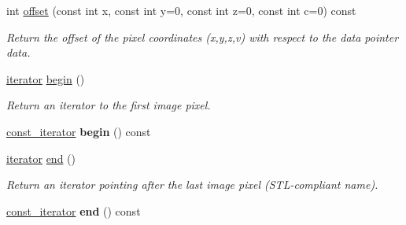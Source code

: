 \begin{DoxyCompactItemize}
\item 
int \hyperlink{structcimg__library_1_1CImg_aac484ab47a32d54cd1eaca9f79e25ee6}{offset} (const int x, const int y=0, const int z=0, const int c=0) const 
\begin{DoxyCompactList}\small\item\em Return the offset of the pixel coordinates ({\ttfamily x},{\ttfamily y},{\ttfamily z},{\ttfamily v}) with respect to the data pointer {\ttfamily data}. \item\end{DoxyCompactList}\item 
\hypertarget{structcimg__library_1_1CImg_ad69bd11391be1a1dba5c8202259664f8}{
\hyperlink{structcimg__library_1_1CImg_a35c955cacac6aacaa1e82874b1628865}{iterator} \hyperlink{structcimg__library_1_1CImg_ad69bd11391be1a1dba5c8202259664f8}{begin} ()}
\label{structcimg__library_1_1CImg_ad69bd11391be1a1dba5c8202259664f8}

\begin{DoxyCompactList}\small\item\em Return an iterator to the first image pixel. \item\end{DoxyCompactList}\item 
\hypertarget{structcimg__library_1_1CImg_aa4b02d4f1a8500fb07a551069060709f}{
\hyperlink{structcimg__library_1_1CImg_a2fc97dce62b7053449cc868607540dba}{const\_\-iterator} {\bfseries begin} () const }
\label{structcimg__library_1_1CImg_aa4b02d4f1a8500fb07a551069060709f}

\item 
\hypertarget{structcimg__library_1_1CImg_acad38d52497a975bfb6f2f6acd76631f}{
\hyperlink{structcimg__library_1_1CImg_a35c955cacac6aacaa1e82874b1628865}{iterator} \hyperlink{structcimg__library_1_1CImg_acad38d52497a975bfb6f2f6acd76631f}{end} ()}
\label{structcimg__library_1_1CImg_acad38d52497a975bfb6f2f6acd76631f}

\begin{DoxyCompactList}\small\item\em Return an iterator pointing after the last image pixel (STL-\/compliant name). \item\end{DoxyCompactList}\item 
\hypertarget{structcimg__library_1_1CImg_a350132543d80a1c1e5be844e6d2878ea}{
\hyperlink{structcimg__library_1_1CImg_a2fc97dce62b7053449cc868607540dba}{const\_\-iterator} {\bfseries end} () const }
\label{structcimg__library_1_1CImg_a350132543d80a1c1e5be844e6d2878ea}


\end{DoxyCompactItemize}
